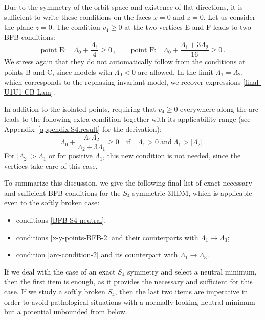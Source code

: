 \documentclass[11pt]{article}
\begin{document}
Due to the symmetry of the orbit space and existence of flat directions,
it is sufficient to write these conditions on the faces $x=0$ and $z=0$.
Let us consider the plane $z=0$.
The condition $v_4 \ge 0$ at the two vertices E and F leads to two BFB conditions:
\begin{equation}
\mbox{point E:}\quad \Lambda_0 + \frac{\Lambda_1}{4} \ge 0\,, \qquad
\mbox{point F:} \quad \Lambda_0 + \frac{\Lambda_1 + 3\Lambda_2}{16} \ge 0\,.
\label{x-y-points-BFB-2}
\end{equation}
We stress again that they do not automatically follow from the conditions at points B and C,
since models with $\Lambda_0 < 0$ are allowed.
In the limit $\Lambda_1 = \Lambda_2$, which corresponds to the rephasing invariant model,
we recover expressions \eqref{final-U1U1-CB-Lam}.

In addition to the isolated points, 
requiring that $v_4 \ge 0$ everywhere along the arc leads to the following extra condition
together with its applicability range (see Appendix~\ref{appendix:S4.result} for the derivation):
\begin{equation}
\Lambda_0 + \frac{\Lambda_1\Lambda_2}{\Lambda_2 + 3\Lambda_1} \ge 0 \quad
\mbox{if}\quad \Lambda_1 > 0 \ \mbox{and} \ \Lambda_1 > |\Lambda_2|\,.\label{arc-condition-2} 
\end{equation}
For $|\Lambda_2| > \Lambda_1$ or for positive $\Lambda_1$, this new condition is not needed,
since the vertices take care of this case.

To summarize this discussion, we give the following final list of exact necessary and sufficient BFB conditions
for the $S_4$-symmetric 3HDM, which is applicable even to the softly broken case:
\begin{itemize}
	\item conditions \eqref{BFB-S4-neutral}, 
	\item
	conditions \eqref{x-y-points-BFB-2} and their counterparts with $\Lambda_1 \to \Lambda_3$;
	\item
	condition \eqref{arc-condition-2} and its counterpart with $\Lambda_1 \to \Lambda_3$.
\end{itemize}
If we deal with the case of an exact $S_4$ symmetry and select a neutral minimum, then the first item
is enough, as it provides the necessary and sufficient for this case.
If we study a softly broken $S_4$, then the last two items are imperative in order to avoid
pathological situations with a normally looking neutral minimum but a potential unbounded from below. 
\end{document}
